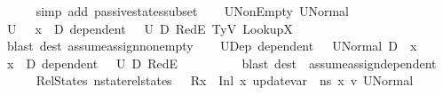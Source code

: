 \begin{isabellebody}
\ \ \ \ \isamarkupfalse%
\ {\isacharparenleft}{\kern0pt}simp\ add{\isacharcolon}{\kern0pt}\ passive{\isacharunderscore}{\kern0pt}states{\isacharunderscore}{\kern0pt}subset{\isacharparenright}{\kern0pt}\isanewline
\ \ \isamarkupfalse%
\ U{}NonEmpty{\isacharcolon}{\kern0pt}\ {\isachardoublequoteopen}{\isacharquery}{\kern0pt}U{}Normal\ {\isasymnoteq}\ {\isacharbraceleft}{\kern0pt}{\isacharbraceright}{\kern0pt}{\isachardoublequoteclose}\ \isamarkupfalse%
\ {\isacartoucheopen}U{}\ {\isasymnoteq}\ {\isacharbraceleft}{\kern0pt}{\isacharbraceright}{\kern0pt}{\isacartoucheclose}\ {\isacartoucheopen}x{}\ {\isasymnotin}\ D{}{\isacartoucheclose}\ {\isacartoucheopen}dependent\ {\isasymLambda}{\isacharprime}{\kern0pt}\ {\isasymOmega}\ U{}\ D{}{\isacartoucheclose}\ RedE{}\ TyV{}\ LookupX{}\isanewline
\ \ \ \ \isamarkupfalse%
\ {\isacharparenleft}{\kern0pt}blast\ dest{\isacharcolon}{\kern0pt}\ assume{\isacharunderscore}{\kern0pt}assign{\isacharunderscore}{\kern0pt}non{\isacharunderscore}{\kern0pt}empty{\isacharparenright}{\kern0pt}\isanewline
\ \ \isamarkupfalse%
\ U{}Dep{\isacharcolon}{\kern0pt}\ {\isachardoublequoteopen}dependent\ {\isasymLambda}{\isacharprime}{\kern0pt}\ {\isasymOmega}\ {\isacharquery}{\kern0pt}U{}Normal\ {\isacharparenleft}{\kern0pt}D{}\ {\isasymunion}\ {\isacharbraceleft}{\kern0pt}x{}{\isacharbraceright}{\kern0pt}{\isacharparenright}{\kern0pt}{\isachardoublequoteclose}\ \isamarkupfalse%
\ {\isacartoucheopen}x{}\ {\isasymnotin}\ D{}{\isacartoucheclose}\ {\isacartoucheopen}dependent\ {\isasymLambda}{\isacharprime}{\kern0pt}\ {\isasymOmega}\ U{}\ D{}{\isacartoucheclose}\ RedE{}\ \ \ \ \isanewline
\ \ \ \ \isamarkupfalse%
\ {\isacharparenleft}{\kern0pt}blast\ dest{\isacharcolon}{\kern0pt}\ \ assume{\isacharunderscore}{\kern0pt}assign{\isacharunderscore}{\kern0pt}dependent{\isacharparenright}{\kern0pt}\isanewline
\ \ \ \ \isamarkupfalse%
\ RelStates{\isacharcolon}{\kern0pt}\ {\isachardoublequoteopen}nstate{\isacharunderscore}{\kern0pt}rel{\isacharunderscore}{\kern0pt}states\ {\isasymLambda}\ {\isasymLambda}{\isacharprime}{\kern0pt}\ {\isacharparenleft}{\kern0pt}R{\isacharparenleft}{\kern0pt}x{}\ {\isasymmapsto}\ {\isacharparenleft}{\kern0pt}Inl\ x{}{\isacharparenright}{\kern0pt}{\isacharparenright}{\kern0pt}{\isacharparenright}{\kern0pt}\ {\isacharparenleft}{\kern0pt}update{\isacharunderscore}{\kern0pt}var\ {\isasymLambda}\ ns\ x{}\ v{}{\isacharparenright}{\kern0pt}\ {\isacharquery}{\kern0pt}U{}Normal{\isachardoublequoteclose}\isanewline

\end{isabellebody}
